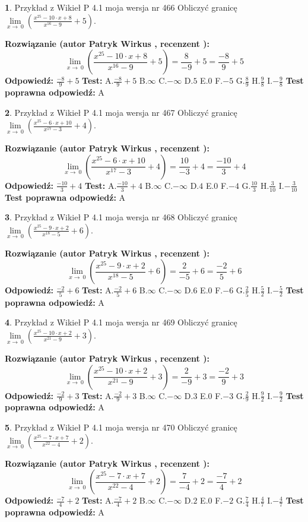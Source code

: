 \documentclass[12pt, a4paper]{article}
\theoremstyle{definition} %
\newtheorem{zad}{}
\newcommand{\zadStart}[1]{\begin{zad}#1\newline}
\newcommand{\zadStop}{\end{zad}}
\newcommand{\rozwStart}[2]{\noindent \textbf{Rozwiązanie (autor #1 , recenzent #2): }\newline}
\newcommand{\rozwStop}{\newline}
\newcommand{\odpStart}{\noindent \textbf{Odpowiedź:}\newline}
\newcommand{\odpStop}{\newline}
\newcommand{\testStart}{\noindent \textbf{Test:}\newline}
\newcommand{\testStop}{\newline}
\newcommand{\kluczStart}{\noindent \textbf{Test poprawna odpowiedź:}\newline}
\newcommand{\kluczStop}{\newline}
\begin{document}
\zadStart{Przykład z Wikieł P 4.1 moja wersja nr 466}
Obliczyć granicę $\lim\limits_{x\to\ 0}(\frac{x^{25}-10 \cdot x +8}{x^{16}-9}+5)$.
\zadStop
\rozwStart{Patryk Wirkus}{}
$$\lim\limits_{x\to\ 0}(\frac{x^{25}-10 \cdot x +8}{x^{16}-9}+5)=\frac{8}{-9}+5=\frac{-8}{9}+5$$
\rozwStop
\odpStart
$\frac{-8}{9}+5$
\odpStop
\testStart
A.$\frac{-8}{9}+5$
B.$\infty$
C.$-\infty$
D.$5$
E.$0$
F.$-5$
G.$\frac{8}{9}$
H.$\frac{9}{8}$
I.$-\frac{9}{8}$
\testStop
\kluczStart
A
\kluczStop



\zadStart{Przykład z Wikieł P 4.1 moja wersja nr 467}
Obliczyć granicę $\lim\limits_{x\to\ 0}(\frac{x^{25}-6 \cdot x +10}{x^{17}-3}+4)$.
\zadStop
\rozwStart{Patryk Wirkus}{}
$$\lim\limits_{x\to\ 0}(\frac{x^{25}-6 \cdot x +10}{x^{17}-3}+4)=\frac{10}{-3}+4=\frac{-10}{3}+4$$
\rozwStop
\odpStart
$\frac{-10}{3}+4$
\odpStop
\testStart
A.$\frac{-10}{3}+4$
B.$\infty$
C.$-\infty$
D.$4$
E.$0$
F.$-4$
G.$\frac{10}{3}$
H.$\frac{3}{10}$
I.$-\frac{3}{10}$
\testStop
\kluczStart
A
\kluczStop



\zadStart{Przykład z Wikieł P 4.1 moja wersja nr 468}
Obliczyć granicę $\lim\limits_{x\to\ 0}(\frac{x^{25}-9 \cdot x +2}{x^{18}-5}+6)$.
\zadStop
\rozwStart{Patryk Wirkus}{}
$$\lim\limits_{x\to\ 0}(\frac{x^{25}-9 \cdot x +2}{x^{18}-5}+6)=\frac{2}{-5}+6=\frac{-2}{5}+6$$
\rozwStop
\odpStart
$\frac{-2}{5}+6$
\odpStop
\testStart
A.$\frac{-2}{5}+6$
B.$\infty$
C.$-\infty$
D.$6$
E.$0$
F.$-6$
G.$\frac{2}{5}$
H.$\frac{5}{2}$
I.$-\frac{5}{2}$
\testStop
\kluczStart
A
\kluczStop



\zadStart{Przykład z Wikieł P 4.1 moja wersja nr 469}
Obliczyć granicę $\lim\limits_{x\to\ 0}(\frac{x^{25}-10 \cdot x +2}{x^{21}-9}+3)$.
\zadStop
\rozwStart{Patryk Wirkus}{}
$$\lim\limits_{x\to\ 0}(\frac{x^{25}-10 \cdot x +2}{x^{21}-9}+3)=\frac{2}{-9}+3=\frac{-2}{9}+3$$
\rozwStop
\odpStart
$\frac{-2}{9}+3$
\odpStop
\testStart
A.$\frac{-2}{9}+3$
B.$\infty$
C.$-\infty$
D.$3$
E.$0$
F.$-3$
G.$\frac{2}{9}$
H.$\frac{9}{2}$
I.$-\frac{9}{2}$
\testStop
\kluczStart
A
\kluczStop



\zadStart{Przykład z Wikieł P 4.1 moja wersja nr 470}
Obliczyć granicę $\lim\limits_{x\to\ 0}(\frac{x^{25}-7 \cdot x +7}{x^{22}-4}+2)$.
\zadStop
\rozwStart{Patryk Wirkus}{}
$$\lim\limits_{x\to\ 0}(\frac{x^{25}-7 \cdot x +7}{x^{22}-4}+2)=\frac{7}{-4}+2=\frac{-7}{4}+2$$
\rozwStop
\odpStart
$\frac{-7}{4}+2$
\odpStop
\testStart
A.$\frac{-7}{4}+2$
B.$\infty$
C.$-\infty$
D.$2$
E.$0$
F.$-2$
G.$\frac{7}{4}$
H.$\frac{4}{7}$
I.$-\frac{4}{7}$
\testStop
\kluczStart
A
\kluczStop
\end{document}
